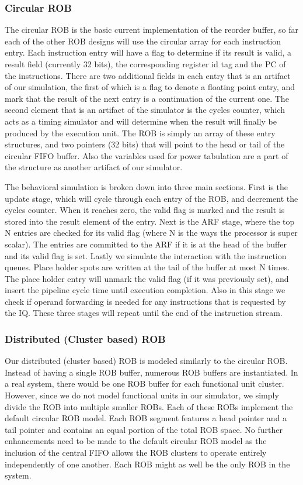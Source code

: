 \subsubsection{Circular ROB}
\label{sec:circ}
The circular ROB is the basic current implementation of the reorder buffer, so far each of the other ROB designs will use the 
circular array for each instruction entry.  Each instruction entry will have a flag to determine if its result is valid, a 
result field (currently 32 bits), the corresponding register id tag and the PC of the instructions.  There are two additional
fields in each entry that is an artifact of our simulation, the first of which is a flag to denote a floating point entry, and 
mark that the result of the next entry is a continuation of the current one.  The second element that is an artifact of the
simulator is the cycles counter, which acts as a timing simulator and will determine when the result will finally be produced
by the execution unit.  The ROB is simply an array of these entry structures, and two pointers (32 bits) that will point
to the head or tail of the circular FIFO buffer.  Also the variables used for power tabulation are a part of the structure as 
another artifact of our simulator.

The behavioral simulation is broken down into three main sections.  First is the update stage, which will cycle 
through each entry of the ROB, and decrement the cycles counter.  When it reaches zero, the valid flag is marked and the
result is stored into the result element of the entry.  Next is the ARF stage, where the top N entries are checked
for its valid flag (where N is the ways the processor is super scalar).  The entries are committed to the ARF if it is at 
the head of the buffer and its valid flag is set.
Lastly we simulate the interaction with the instruction queues.  Place holder spots are written at the tail of the buffer
at most N times. The place holder entry will unmark the valid flag (if it was previously set), and insert the pipeline cycle
time until execution completion. Also in this stage we check if operand forwarding is needed for any instructions that is 
requested by the IQ.  These three stages will repeat until the end of the instruction stream.

\subsubsection{Distributed (Cluster based) ROB}
Our distributed (cluster based) ROB is modeled similarly to the circular ROB.  Instead of having a single ROB buffer, numerous ROB buffers are instantiated.  In a real system, there would be one ROB buffer for each functional unit cluster.  However, since we do not model functional units in our simulator, we simply divide the ROB into multiple smaller ROBs.  Each of these ROBs implement the default circular ROB model.  Each ROB segment features a head pointer and a tail pointer and contains an equal portion of the total ROB space.  No further enhancements need to be made to the default circular ROB model as the inclusion of the central FIFO allows the ROB clusters to operate entirely independently of one another.  Each ROB might as well be the only ROB in the system.

